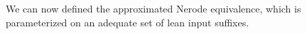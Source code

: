 





We can now defined the approximated Nerode equivalence, which is parameterized
on an adequate set of lean input suffixes.

